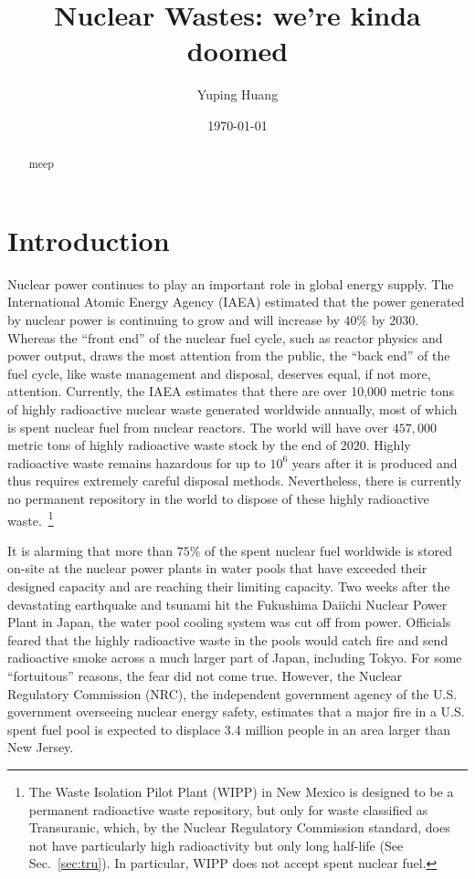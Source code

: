 \documentclass[nofootinbib,preprint,aip,pra]{revtex4-1}
\begin{document}
\title{Nuclear Wastes: we're kinda doomed}

\author{Yuping Huang}%

\date{\today}%
\begin{abstract}
    meep
\end{abstract}
\maketitle
\tableofcontents
\newpage

\section{Introduction}
Nuclear power continues to play an important role in global energy supply.
The International Atomic Energy Agency (IAEA) estimated that the power generated by nuclear power
is continuing to grow and will increase by $40\%$ by 2030.\cite{iaea12}
Whereas the ``front end'' of the nuclear fuel cycle, such as reactor physics and power output, draws
the most attention from the public, the ``back end'' of the fuel cycle, like waste management and
disposal, deserves equal, if not more, attention.
Currently, the IAEA estimates that there are over 10,000 metric tons of highly radioactive nuclear waste 
generated worldwide annually,
most of which is spent nuclear fuel from nuclear reactors.\cite{iaea08, r12}
The world will have over $457,000$ metric tons of highly radioactive waste stock by the end of 2020.\cite{r12}
Highly radioactive waste remains hazardous for up to $10^6$ years after it is produced and thus
requires extremely careful disposal methods.
Nevertheless, there is currently no permanent repository in the world to dispose of these highly radioactive
waste.~\footnote{The Waste Isolation Pilot Plant (WIPP) in New Mexico is designed to be a permanent radioactive
    waste repository, but only
for waste classified as Transuranic, which, by the Nuclear Regulatory Commission standard, does not have particularly
high radioactivity but only long half-life (See Sec.~\ref{sec:tru}). In particular, WIPP does not accept spent nuclear
fuel.}  

It is alarming that more than $75\%$ of the spent nuclear fuel worldwide is stored on-site at the nuclear power plants
in water pools that have exceeded their designed capacity and are reaching their limiting capacity.\cite{aa12}
Two weeks after the devastating earthquake and tsunami hit the Fukushima Daiichi Nuclear Power Plant in Japan,
the water pool cooling system was cut off from power. Officials feared that
the highly radioactive waste in the pools would catch fire and send radioactive smoke
across a much larger part of Japan, including Tokyo. For some ``fortuitous'' reasons, the fear did not come true.
However, the Nuclear Regulatory Commission (NRC), the independent government agency
of the U.S. government overseeing nuclear energy safety,
estimates that a major fire in a U.S. spent fuel pool is expected to
displace 3.4 million people in an area larger than New Jersey.\cite{s16}
\end{document}
